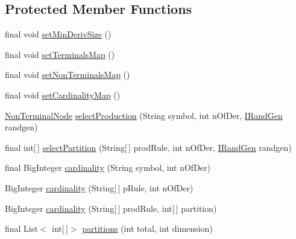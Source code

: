 \subsection*{Protected Member Functions}
\begin{DoxyCompactItemize}
\item 
final void \hyperlink{classnet_1_1sf_1_1jclec_1_1syntaxtree_1_1_syntax_tree_schema_a9cc2c25811aa30578d88c2c8b5550e2d}{set\-Min\-Deriv\-Size} ()
\item 
final void \hyperlink{classnet_1_1sf_1_1jclec_1_1syntaxtree_1_1_syntax_tree_schema_a4d4b1a05f06d6822ba78588e223c8406}{set\-Terminals\-Map} ()
\item 
final void \hyperlink{classnet_1_1sf_1_1jclec_1_1syntaxtree_1_1_syntax_tree_schema_a8f6b7ae58729e5892831302db5ddef62}{set\-Non\-Terminals\-Map} ()
\item 
final void \hyperlink{classnet_1_1sf_1_1jclec_1_1syntaxtree_1_1_syntax_tree_schema_a9f5674189c543de98afd908da719ed0e}{set\-Cardinality\-Map} ()
\item 
\hyperlink{classnet_1_1sf_1_1jclec_1_1syntaxtree_1_1_non_terminal_node}{Non\-Terminal\-Node} \hyperlink{classnet_1_1sf_1_1jclec_1_1syntaxtree_1_1_syntax_tree_schema_ad9bd88db055899597305fbe8e3695c20}{select\-Production} (String symbol, int n\-Of\-Der, \hyperlink{interfacenet_1_1sf_1_1jclec_1_1util_1_1random_1_1_i_rand_gen}{I\-Rand\-Gen} randgen)
\item 
final int\mbox{[}$\,$\mbox{]} \hyperlink{classnet_1_1sf_1_1jclec_1_1syntaxtree_1_1_syntax_tree_schema_a056d3f749fd7e1a23beb85cf975ef667}{select\-Partition} (String\mbox{[}$\,$\mbox{]} prod\-Rule, int n\-Of\-Der, \hyperlink{interfacenet_1_1sf_1_1jclec_1_1util_1_1random_1_1_i_rand_gen}{I\-Rand\-Gen} randgen)
\item 
final Big\-Integer \hyperlink{classnet_1_1sf_1_1jclec_1_1syntaxtree_1_1_syntax_tree_schema_a70e02409c7ab7d58ae183adaad8a8791}{cardinality} (String symbol, int n\-Of\-Der)
\item 
Big\-Integer \hyperlink{classnet_1_1sf_1_1jclec_1_1syntaxtree_1_1_syntax_tree_schema_aff605e0d1233a0efe33a71491deec38e}{cardinality} (String\mbox{[}$\,$\mbox{]} p\-Rule, int n\-Of\-Der)
\item 
Big\-Integer \hyperlink{classnet_1_1sf_1_1jclec_1_1syntaxtree_1_1_syntax_tree_schema_aa23be6dd1b839c27baed81fb42d0a05b}{cardinality} (String\mbox{[}$\,$\mbox{]} prod\-Rule, int\mbox{[}$\,$\mbox{]} partition)
\item 
final List$<$ int\mbox{[}$\,$\mbox{]}$>$ \hyperlink{classnet_1_1sf_1_1jclec_1_1syntaxtree_1_1_syntax_tree_schema_a6d87daa09f194b57fc6b7353d10a54f1}{partitions} (int total, int dimension)
\end{DoxyCompactItemize}
